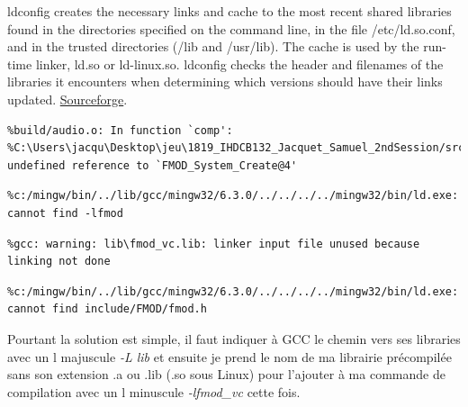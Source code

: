 \documentclass[12pt]{article}
\begin{document}
ldconfig creates the necessary links and cache to the most recent shared libraries found in the directories specified on the command line, in the file /etc/ld.so.conf, and in the trusted directories (/lib and /usr/lib). The cache is used by the run-time linker, ld.so or ld-linux.so. ldconfig checks the header and filenames of the libraries it encounters when determining which versions should have their links updated. \href{https://linux.die.net/man/8/ldconfig}{Sourceforge}\cite{ldconfig(8) - Linux man page}.

\begin{lstlisting}
%build/audio.o: In function `comp':
%C:\Users\jacqu\Desktop\jeu\1819_IHDCB132_Jacquet_Samuel_2ndSession/src/audio.c:25: undefined reference to `FMOD_System_Create@4'
\end{lstlisting}
\begin{lstlisting}
%c:/mingw/bin/../lib/gcc/mingw32/6.3.0/../../../../mingw32/bin/ld.exe: cannot find -lfmod
\end{lstlisting}
\begin{lstlisting}
%gcc: warning: lib\fmod_vc.lib: linker input file unused because linking not done
\end{lstlisting}
\begin{lstlisting}
%c:/mingw/bin/../lib/gcc/mingw32/6.3.0/../../../../mingw32/bin/ld.exe: cannot find include/FMOD/fmod.h
\end{lstlisting}

Pourtant la solution est simple, il faut indiquer à GCC le chemin vers ses libraries avec un l majuscule \emph{-L lib} et ensuite je prend le nom de ma librairie précompilée sans son extension .a ou .lib (.so sous Linux) pour l'ajouter à ma commande de compilation avec un l minuscule \emph{-lfmod\_vc} cette fois.\\
\newpage
\end{document}
